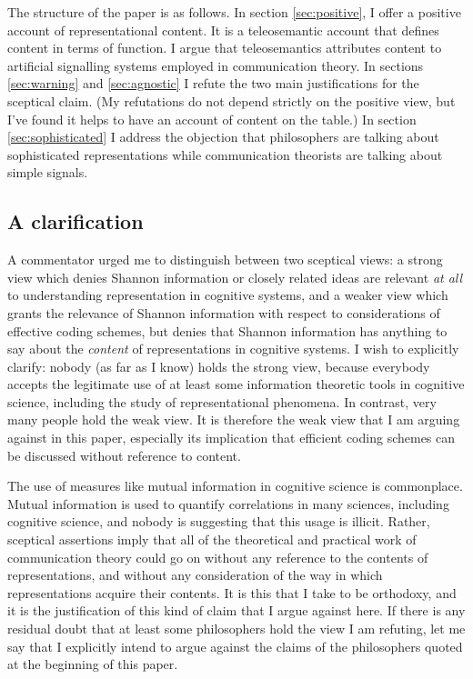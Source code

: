 \documentclass[12pt]{article}
\begin{document}
The structure of the paper is as follows.
In section \ref{sec:positive}, I offer a positive account of representational content.
It is a teleosemantic account that defines content in terms of function.
I argue that teleosemantics attributes content to artificial signalling systems employed in communication theory.
In sections \ref{sec:warning} and \ref{sec:agnostic} I refute the two main justifications for the sceptical claim.
(My refutations do not depend strictly on the positive view, but I've found it helps to have an account of content on the table.)
In section \ref{sec:sophisticated} I address the objection that philosophers are talking about sophisticated representations while communication theorists are talking about simple signals.

\subsection{A clarification}

A commentator urged me to distinguish between two sceptical views: a strong view which denies Shannon information or closely related ideas are relevant \textit{at all} to understanding representation in cognitive systems, and a weaker view which grants the relevance of Shannon information with respect to considerations of effective coding schemes, but denies that Shannon information has anything to say about the \textit{content} of representations in cognitive systems.
I wish to explicitly clarify: nobody (as far as I know) holds the strong view, because everybody accepts the legitimate use of at least some information theoretic tools in cognitive science, including the study of representational phenomena.
In contrast, very many people hold the weak view.
It is therefore the weak view that I am arguing against in this paper, especially its implication that efficient coding schemes can be discussed without reference to content.

The use of measures like mutual information in cognitive science is commonplace.
Mutual information is used to quantify correlations in many sciences, including cognitive science, and nobody is suggesting that this usage is illicit.
Rather, sceptical assertions imply that all of the theoretical and practical work of communication theory could go on without any reference to the contents of representations, and without any consideration of the way in which representations acquire their contents.
It is this that I take to be orthodoxy, and it is the justification of this kind of claim that I argue against here.
If there is any residual doubt that at least some philosophers hold the view I am refuting, let me say that I explicitly intend to argue against the claims of the philosophers quoted at the beginning of this paper.
\end{document}
